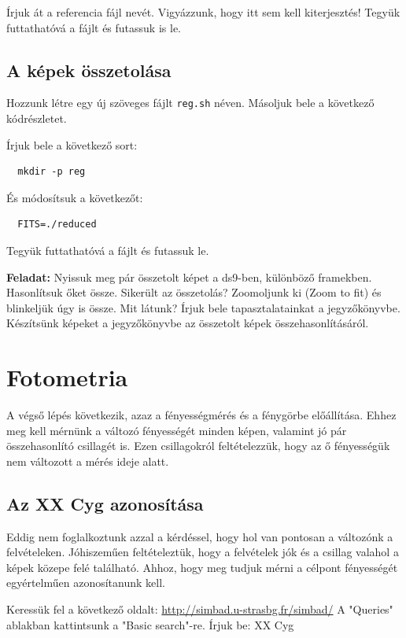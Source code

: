 \documentclass{article}
\begin{document}
Írjuk át a referencia fájl nevét. Vigyázzunk, hogy itt sem kell kiterjesztés!
Tegyük futtathatóvá a fájlt és futassuk is le.

\subsection{A képek összetolása}

Hozzunk létre egy új szöveges fájlt \verb+reg.sh+ néven. Másoljuk bele a következő kódrészletet.

Írjuk bele a következő sort:
\begin{verbatim}
  mkdir -p reg
\end{verbatim}

És módosítsuk a következőt:

\begin{verbatim}
  FITS=./reduced
\end{verbatim}

Tegyük futtathatóvá a fájlt és futassuk le.

{\bf Feladat:}
Nyissuk meg pár összetolt képet a ds9-ben, különböző framekben. Hasonlítsuk
őket össze. Sikerült az összetolás? Zoomoljunk ki (Zoom to fit) és blinkeljük
úgy is össze. Mit látunk? Írjuk bele tapasztalatainkat a jegyzőkönyvbe.
Készítsünk képeket a jegyzőkönyvbe az összetolt képek összehasonlításáról.

\section{Fotometria}

A végső lépés következik, azaz a fényességmérés és a fénygörbe előállítása.
Ehhez meg kell mérnünk a változó fényességét minden képen, valamint jó pár
összehasonlító csillagét is. Ezen csillagokról feltételezzük, hogy az ő
fényességük nem változott a mérés ideje alatt.

\subsection{Az XX Cyg azonosítása}

Eddig nem foglalkoztunk azzal a kérdéssel, hogy hol van pontosan a változónk a
felvételeken. Jóhiszeműen feltételeztük, hogy a felvételek jók és a csillag
valahol a képek közepe felé található. Ahhoz, hogy meg tudjuk mérni a célpont
fényességét egyértelműen azonosítanunk kell.

Keressük fel a következő oldalt:
\url{http://simbad.u-strasbg.fr/simbad/} A "Queries" ablakban kattintsunk a
"Basic search"-re. Írjuk be: XX Cyg
\end{document}
